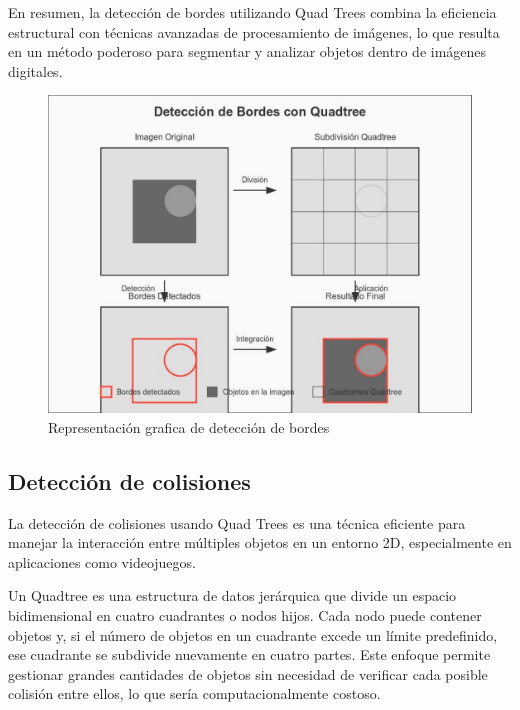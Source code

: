 \documentclass[9pt,a4paper,twoside]{rho-class/rho}
\begin{document}
            En resumen, la detección de bordes utilizando Quad Trees combina la eficiencia estructural con técnicas avanzadas de procesamiento de imágenes, lo que resulta en un método poderoso para segmentar y analizar objetos dentro de imágenes digitales.
            \begin{figure}[h]
                \centering
                \includegraphics[width=\linewidth]{figures/edge-detection.pdf}
                \caption{Representación grafica de detección de bordes} 
                \label{fig:deteccion_figure}
            \end{figure}
        \subsection{Detección de colisiones}

        La detección de colisiones usando Quad Trees es una técnica eficiente para manejar la interacción entre múltiples objetos en un entorno 2D, especialmente en aplicaciones como videojuegos.

        Un Quadtree es una estructura de datos jerárquica que divide un espacio bidimensional en cuatro cuadrantes o nodos hijos. Cada nodo puede contener objetos y, si el número de objetos en un cuadrante excede un límite predefinido, ese cuadrante se subdivide nuevamente en cuatro partes. Este enfoque permite gestionar grandes cantidades de objetos sin necesidad de verificar cada posible colisión entre ellos, lo que sería computacionalmente costoso.
\end{document}
